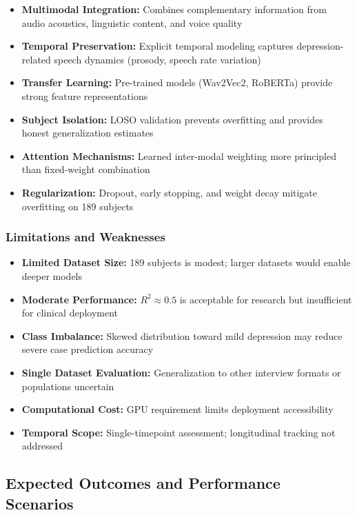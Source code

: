 \documentclass[12pt]{article}
\begin{document}
	\begin{itemize}
		\item \textbf{Multimodal Integration:} Combines complementary information from audio acoustics, linguistic content, and voice quality
		\item \textbf{Temporal Preservation:} Explicit temporal modeling captures depression-related speech dynamics (prosody, speech rate variation)
		\item \textbf{Transfer Learning:} Pre-trained models (Wav2Vec2, RoBERTa) provide strong feature representations
		\item \textbf{Subject Isolation:} LOSO validation prevents overfitting and provides honest generalization estimates
		\item \textbf{Attention Mechanisms:} Learned inter-modal weighting more principled than fixed-weight combination
		\item \textbf{Regularization:} Dropout, early stopping, and weight decay mitigate overfitting on 189 subjects
	\end{itemize}

	\subsubsection{Limitations and Weaknesses}

	\begin{itemize}
		\item \textbf{Limited Dataset Size:} 189 subjects is modest; larger datasets would enable deeper models
		\item \textbf{Moderate Performance:} $R^2 \approx 0.5$ is acceptable for research but insufficient for clinical deployment
		\item \textbf{Class Imbalance:} Skewed distribution toward mild depression may reduce severe case prediction accuracy
		\item \textbf{Single Dataset Evaluation:} Generalization to other interview formats or populations uncertain
		\item \textbf{Computational Cost:} GPU requirement limits deployment accessibility
		\item \textbf{Temporal Scope:} Single-timepoint assessment; longitudinal tracking not addressed
	\end{itemize}

	\subsection{Expected Outcomes and Performance Scenarios}
\end{document}
